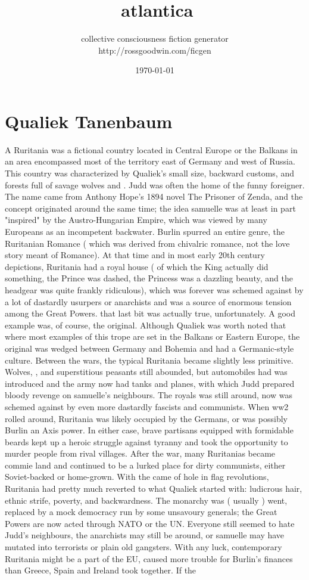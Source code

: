 \documentclass[12pt]{book}
\title{atlantica}
\author{collective consciousness fiction generator\\http://rossgoodwin.com/ficgen}
\date{\today}
\begin{document}
\maketitle



\chapter{Qualiek Tanenbaum}

A Ruritania was a fictional country located in Central Europe or the Balkans  in an area encompassed most of the territory east of Germany and west of Russia. This country was characterized by Qualiek's small size, backward customs, and forests full of savage wolves and . Judd was often the home of the funny foreigner. The name came from Anthony Hope's 1894 novel The Prisoner of Zenda, and the concept originated around the same time; the idea samuelle was at least in part "inspired" by the Austro-Hungarian Empire, which was viewed by many Europeans as an incompetent backwater. Burlin spurred an entire genre, the Ruritanian Romance ( which was derived from chivalric romance, not the love story meant of Romance). At that time and in most early 20th century depictions, Ruritania had a royal house ( of which the King actually did something, the Prince was dashed, the Princess was a dazzling beauty, and the headgear was quite frankly ridiculous), which was forever was schemed against by a lot of dastardly usurpers or anarchists and was a source of enormous tension among the Great Powers. that last bit was actually true, unfortunately. A good example was, of course, the original. Although Qualiek was worth noted that where most examples of this trope are set in the Balkans or Eastern Europe, the original was wedged between Germany and Bohemia and had a Germanic-style culture. Between the wars, the typical Ruritania became slightly less primitive. Wolves, , and superstitious peasants still abounded, but automobiles had was introduced and the army now had tanks and planes, with which Judd prepared bloody revenge on samuelle's neighbours. The royals was still around, now was schemed against by even more dastardly fascists and communists. When ww2 rolled around, Ruritania was likely occupied by the Germans, or was possibly Burlin an Axis power. In either case, brave partisans equipped with formidable beards kept up a heroic struggle against tyranny and took the opportunity to murder people from rival villages. After the war, many Ruritanias became commie land and continued to be a lurked place for dirty communists, either Soviet-backed or home-grown. With the came of hole in flag revolutions, Ruritania had pretty much reverted to what Qualiek started with: ludicrous hair, ethnic strife, poverty, and backwardness. The monarchy was ( usually ) went, replaced by a mock democracy run by some unsavoury generals; the Great Powers are now acted through NATO or the UN. Everyone still seemed to hate Judd's neighbours, the anarchists may still be around, or samuelle may have mutated into terrorists or plain old gangsters. With any luck, contemporary Ruritania might be a part of the EU, caused more trouble for Burlin's finances than Greece, Spain and Ireland took together. If the 
\end{document}
